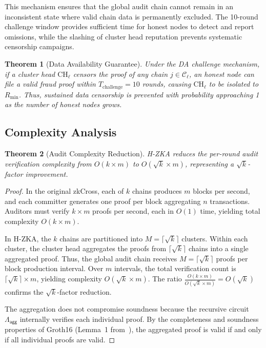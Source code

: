 \documentclass[journal]{IEEEtran}
\newtheorem{theorem}{Theorem}
\newcommand{\aggCircuit}{\Lambda_{\mathsf{agg}}}
\begin{document}
This mechanism ensures that the global audit chain cannot remain in an inconsistent state where valid chain data is permanently excluded. The 10-round challenge window provides sufficient time for honest nodes to detect and report omissions, while the slashing of cluster head reputation prevents systematic censorship campaigns.

\begin{theorem}[Data Availability Guarantee]
\label{thm:da_guarantee}
Under the DA challenge mechanism, if a cluster head $\text{CH}_\ell$ censors the proof of any chain $j \in \mathcal{C}_\ell$, an honest node can file a valid fraud proof within $T_{\text{challenge}} = 10$ rounds, causing $\text{CH}_\ell$ to be isolated to $R_{\min}$. Thus, sustained data censorship is prevented with probability approaching 1 as the number of honest nodes grows.
\end{theorem}

\subsection{Complexity Analysis}

\begin{theorem}[Audit Complexity Reduction]
\label{thm:complexity}
H-ZKA reduces the per-round audit verification complexity from $O(k \times m)$ to $O(\sqrt{k} \times m)$, representing a $\sqrt{k}$-factor improvement.
\end{theorem}

\begin{proof}
In the original zkCross, each of $k$ chains produces $m$ blocks per second, and each committer generates one proof per block aggregating $n$ transactions. Auditors must verify $k \times m$ proofs per second, each in $O(1)$ time, yielding total complexity $O(k \times m)$.

In H-ZKA, the $k$ chains are partitioned into $M = \lceil\sqrt{k}\rceil$ clusters. Within each cluster, the cluster head aggregates the proofs from $\lceil\sqrt{k}\rceil$ chains into a single aggregated proof. Thus, the global audit chain receives $M = \lceil\sqrt{k}\rceil$ proofs per block production interval. Over $m$ intervals, the total verification count is $\lceil\sqrt{k}\rceil \times m$, yielding complexity $O(\sqrt{k} \times m)$. The ratio $\frac{O(k \times m)}{O(\sqrt{k} \times m)} = O(\sqrt{k})$ confirms the $\sqrt{k}$-factor reduction.

The aggregation does not compromise soundness because the recursive circuit $\aggCircuit$ internally verifies each individual proof. By the completeness and soundness properties of Groth16 (Lemma~1 from~\cite{guo2024zkcross}), the aggregated proof is valid if and only if all individual proofs are valid.
\end{proof}
\end{document}
